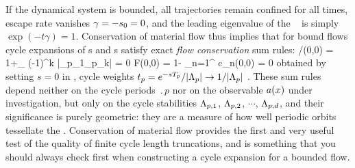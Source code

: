 


If the dynamical system is bounded, all trajectories remain confined for
all times, escape rate  vanishes $\gamma=-s_0=0$, and the
leading eigenvalue
of the \FPoper\  is simply
$\exp(-t\gamma)=1$.
Conservation of material flow thus implies that for bound flows
cycle expansions  of \dzeta s and \Fd s satisfy
exact {\em flow conservation} sum rules:
/\zeta(0,0) = 1+\sumprime_\pseudos
		{ (-1)^k \over
		|\ExpaEig_{p_1}\cdots \ExpaEig_{p_k}|} = 0
	\label{prob-cons-zeta}
\eeq
\beq
	F(0,0) = 1- \sum_{n=1}^{\infty} c_{n}(0,0) = 0
\label{prob-cons-F}
\eeq
obtained by setting $s=0$ in , 
cycle weights
$t_p  = e^{- s {T_{p}}} /|\Lambda_p|
\to {1 / |\ensuremath{\Lambda}_p|}$ .
These sum rules depend neither
on the cycle periods $\period{p}$
nor on the observable $a(x)$ under investigation,
but only on the cycle stabilities $\Lambda_{p,1}$, $\Lambda_{p,2}$,
$\cdots$, $\Lambda_{p,d}$,
and their significance is purely geometric: they are a measure
of how well periodic orbits tessellate the {\statesp}.
Conservation of material flow
provides the first and very useful test of the quality of
finite cycle length truncations, and is something that
you should always check first when constructing a cycle
expansion for a bounded flow. 
